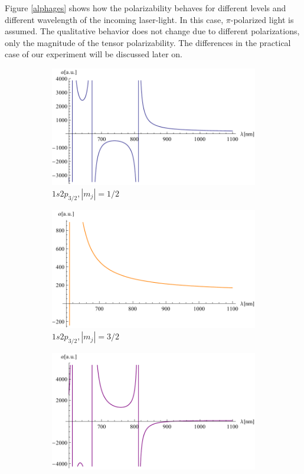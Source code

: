 Figure \ref{alphages} shows how the polarizability behaves for different levels and different wavelength of the incoming laser-light. In this case, $\pi$-polarized light is assumed. The qualitative behavior does not change due to different polarizations, only the magnitude of the tensor polarizability. The differences in the practical case of our experiment will be discussed later on.
\begin{figure}[H]
\centering
\begin{subfigure}[b]{0.4\textwidth}
               \includegraphics[width=\textwidth]{alphaexited12}
                \caption{$1s2p_{3/2}, |m_j|=1/2$}
\end{subfigure}
\begin{subfigure}[b]{0.4\textwidth}
               \includegraphics[width=\textwidth]{alphaexited32}
                \caption{$1s2p_{3/2}, |m_j|=3/2$}
\end{subfigure}
\begin{subfigure}[b]{0.4\textwidth}
                \includegraphics[width=\textwidth]{alphadiff12}

\end{subfigure}
\end{figure}
